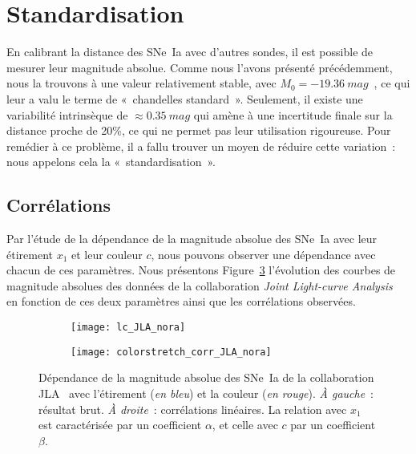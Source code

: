 \documentclass[../main/main.tex]{subfiles}
\begin{document}
\section{Standardisation}\label{sec:stand}

En calibrant la distance des SNe~Ia avec d'autres sondes, il est possible de
mesurer leur magnitude absolue. Comme nous l'avons présenté précédemment, nous
la trouvons à une valeur relativement stable, avec $M_0 =
-\SI{19.36}{mag}$~\citep{kessler2009b}, ce qui leur a valu le terme de
«~chandelles standard~». Seulement, il existe une variabilité intrinsèque de
$\approx \SI{0.35}{mag}$ qui amène à une incertitude finale sur la distance
proche de 20\%, ce qui ne permet pas leur utilisation rigoureuse. Pour remédier
à ce problème, il a fallu trouver un moyen de réduire cette variation~: nous
appelons cela la «~standardisation~».

\subsection{Corrélations}\label{ssec:corr}

Par l'étude de la dépendance de la magnitude absolue des SNe~Ia avec leur
étirement $x_1$ et leur couleur $c$, nous pouvons observer une dépendance
avec chacun de ces paramètres. Nous présentons Figure~\ref{fig:mxc} l'évolution
des courbes de magnitude absolues des données de la collaboration \textit{Joint
Light-curve Analysis}~\citep[JLA,][]{betoule2014} en fonction de ces deux
paramètres ainsi que les corrélations observées.

\begin{figure}[]
    \centering
    \begin{subfigure}[c]{.48\linewidth}
        \centering
        \texttt{[image: lc\_JLA\_nora]}
        \label{fig:mxca}
    \end{subfigure}
    \begin{subfigure}[c]{.48\linewidth}
        \centering
        \texttt{[image: colorstretch\_corr\_JLA\_nora]}
        \label{fig:mxcb}
    \end{subfigure}
    \caption[Dépendance de la magnitude absolue des SNe~Ia de la collaboration
    JLA avec l'étirement et la couleur]{Dépendance de la magnitude absolue des
        SNe~Ia de la collaboration JLA~\citep{betoule2014} avec l'étirement
        (\textit{en bleu}) et la couleur (\textit{en rouge}). \textit{À
        gauche}~: résultat brut. \textit{À droite}~: corrélations linéaires. La
        relation avec $x_1$ est caractérisée par un coefficient $\alpha$, et
    celle avec $c$ par un coefficient $\beta$.}\label{fig:mxc}
\end{figure}
\end{document}

